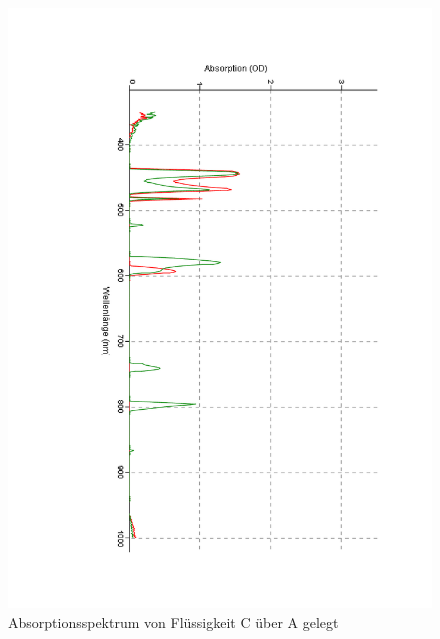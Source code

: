 \documentclass[12pt,a4paper]{article}
\begin{document}
\begin{figure}[H]
	\centering
	\includegraphics[scale=0.5,angle = 90,trim = 20mm 20mm 20mm 20mm]{./data/Spektro/Absorbtion_CuA_DO_4.pdf}
	\caption{Absorptionsspektrum von Flüssigkeit C über A gelegt}
	\label{fig:AbsorbtionCuA}
\end{figure}
\end{document}
